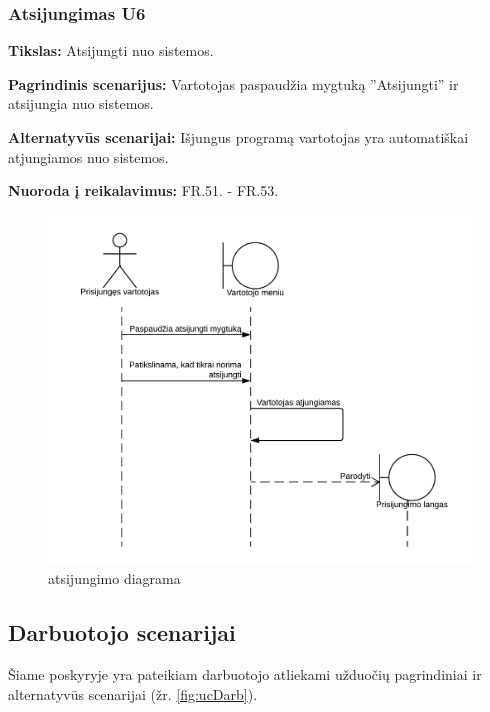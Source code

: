 \documentclass{VUMIFPSkursinis}
\begin{document}
 \subsubsection{Atsijungimas U6}

	\textbf{Tikslas:} Atsijungti nuo sistemos.

	\textbf{Pagrindinis scenarijus:} Vartotojas paspaudžia mygtuką ”Atsijungti” ir atsijungia nuo sistemos.

	\textbf{Alternatyvūs scenarijai:} Išjungus programą vartotojas yra automatiškai atjungiamos nuo sistemos.

	\textbf{Nuoroda į reikalavimus:} FR.51. - FR.53.
    
\begin{figure}[H]
    \label{fig:logoffdiag}
    \centering
    \includegraphics[width=1\textwidth]{Sekos_diagramos/atsijungti_seq_diag}
    \caption{atsijungimo diagrama}
\end{figure}

\pagebreak

\subsection{Darbuotojo scenarijai}
Šiame poskyryje yra pateikiam darbuotojo atliekami užduočių pagrindiniai ir alternatyvūs scenarijai (žr. \ref{fig:ucDarb}).
\end{document}
